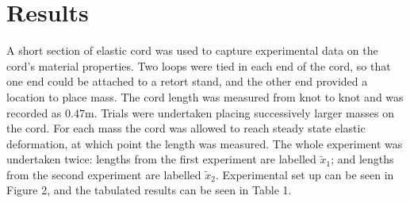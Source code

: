\documentclass[a4paper]{article}
\begin{document}
\section{Results}
A short section of elastic cord was used to capture experimental data on the cord's material properties. Two loops were tied in each end of the cord, so that one end could be attached to a retort stand, and the other end provided a location to place mass. The cord length was measured from knot to knot and was recorded as $0.47\si{\meter}$. Trials were undertaken placing successively larger masses on the cord. For each mass the cord was allowed to reach steady state elastic deformation, at which point the length was measured. The whole experiment was undertaken twice: lengths from the first experiment are labelled $\tilde{x}_1$; and lengths from the second experiment are labelled $\tilde{x}_2$. Experimental set up can be seen in Figure 2, and the tabulated results can be seen in Table 1.\\
\end{document}
